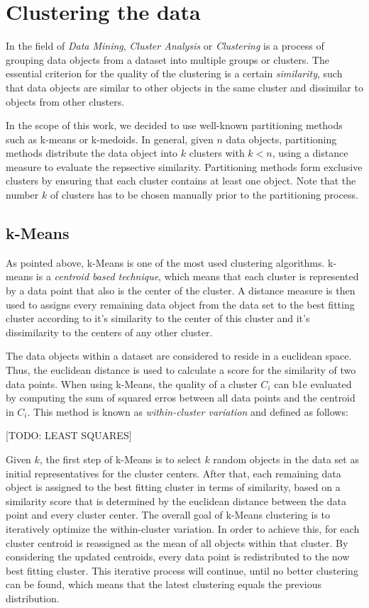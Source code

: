 \documentclass[11pt]{article}
\begin{document}
\section*{Clustering the data}

In the field of \textit{Data Mining}, \textit{Cluster Analysis} or \textit{Clustering} is a process of grouping data objects from a dataset into multiple groups or clusters. The essential criterion for the quality of the clustering is a certain \textit{similarity}, such that data objects are similar to other objects in the same cluster and dissimilar to objects from other clusters. 

In the scope of this work, we decided to use well-known partitioning methods such as k-means or k-medoids. In general, given $n$ data objects, partitioning methods distribute the data object into $k$ clusters with $k<n$, using a distance measure to evaluate the repsective similarity. Partitioning methods form exclusive clusters by ensuring that each cluster contains at least one object. Note that the number $k$ of clusters has to be chosen manually prior to the partitioning process.

\subsection{k-Means}

As pointed above, k-Means is one of the most used clustering algorithms. k-means is a \textit{centroid based technique}, which means that each cluster is represented by a data point that also is the center of the cluster. A distance measure is then used to assigns every remaining data object from the data set to the best fitting cluster according to it's similarity to the center of this cluster and it's dissimilarity to the centers of any other cluster.

The data objects within a dataset are considered to reside in a euclidean space. Thus, the euclidean distance is used to calculate a score for the similarity of two data points. When using k-Means, the quality of a cluster $C_i$ can b1e evaluated by computing the sum of squared erros between all data points and the centroid in $C_i$. This method is known as \textit{within-cluster variation} and defined as follows: 

[TODO: LEAST SQUARES]

Given $k$, the first step of k-Means is to select $k$ random objects in the data set as initial representatives for the cluster centers. After that, each remaining data object is assigned to the best fitting cluster in terms of similarity, based on a similarity score that is determined by the euclidean distance between the data point and every cluster center. The overall goal of k-Means clustering is to iteratively optimize the within-cluster variation. In order to achieve this, for each cluster centroid is reassigned as the mean of all objects within that cluster. By considering the updated centroids, every data point is redistributed to the now best fitting cluster. This iterative process will continue, until no better clustering can be found, which means that the latest clustering equals the previous distribution.
\end{document}
